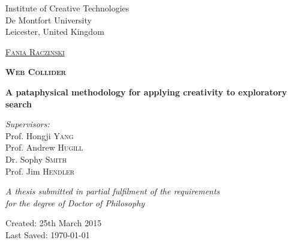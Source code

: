 
\begin{titlepage}
\begin{center}

Institute of Creative Technologies\\
De Montfort University\\
Leicester, United Kingdom

\vspace{2cm}

\textsc{\huge \href{http://fania.uk}{Fania Raczinski}}

\vspace{2cm}


\textsc{\Huge \bfseries Web Collider}

\vspace{1.5cm}

{\huge \bfseries A pataphysical methodology for applying creativity to exploratory search}

\vspace{2cm}

\emph{Supervisors:}\\
{Prof. Hongji \textsc{Yang}}\\
{Prof. Andrew \textsc{Hugill}}\\
{Dr. Sophy \textsc{Smith}}\\
{Prof. Jim \textsc{Hendler}}

\vspace{1.5cm}

\large \textit{A thesis submitted in partial fulfilment of the requirements\\ for the degree of Doctor of Philosophy}

\vfill

Created: {25th March 2015}\\
Last Saved: {\today}

\end{center}
\end{titlepage}
